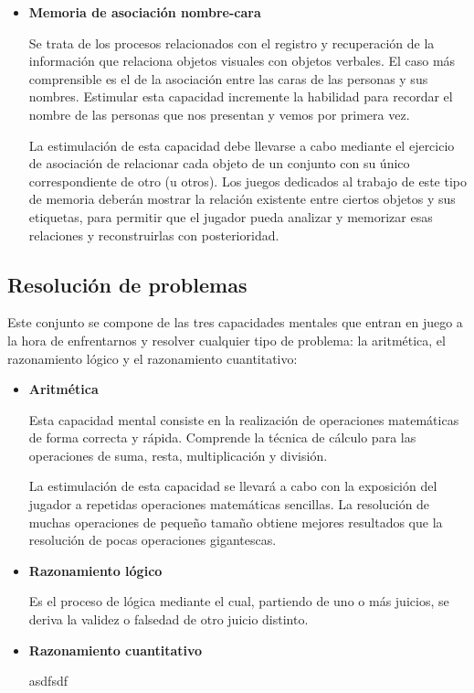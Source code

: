 \begin{itemize}
\item {\bf Memoria de asociación nombre-cara}

Se trata de los procesos relacionados con el registro y recuperación de la información que relaciona objetos visuales con objetos verbales. El caso más comprensible es el de la asociación entre las caras de las personas y sus nombres. Estimular esta capacidad incremente la habilidad para recordar el nombre de las personas que nos presentan y vemos por primera vez.

La estimulación de esta capacidad debe llevarse a cabo mediante el ejercicio de asociación de relacionar cada objeto de un conjunto con su único correspondiente de otro (u otros). Los juegos dedicados al trabajo de este tipo de memoria deberán mostrar la relación existente entre ciertos objetos y sus etiquetas, para permitir que el jugador pueda analizar y memorizar esas relaciones y reconstruirlas con posterioridad.

\end{itemize}

\subsection*{Resolución de problemas}

Este conjunto se compone de las tres capacidades mentales que entran en juego a la hora de enfrentarnos y resolver cualquier tipo de problema: la aritmética, el razonamiento lógico y el razonamiento cuantitativo:

\begin{itemize}
\item {\bf Aritmética}

Esta capacidad mental consiste en la realización de operaciones matemáticas de forma correcta y rápida. Comprende la técnica de cálculo para las operaciones de suma, resta, multiplicación y división.

La estimulación de esta capacidad se llevará a cabo con la exposición del jugador a repetidas operaciones matemáticas sencillas. La resolución de muchas operaciones de pequeño tamaño obtiene mejores resultados que la resolución de pocas operaciones gigantescas.

\item {\bf Razonamiento lógico}

Es el proceso de lógica mediante el cual, partiendo de uno o más juicios, se deriva la validez o falsedad de otro juicio distinto.

\item {\bf Razonamiento cuantitativo}

asdfsdf

\end{itemize}


